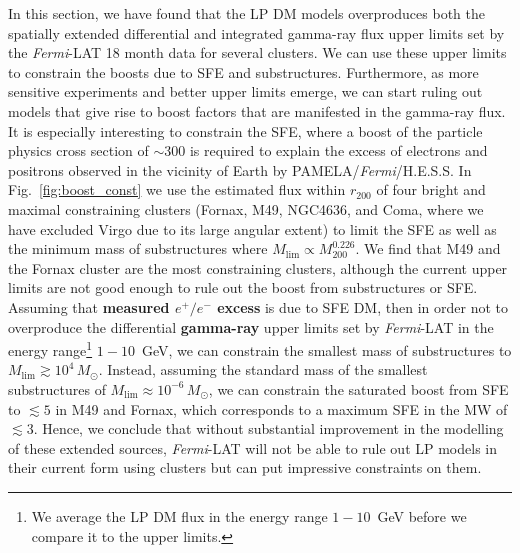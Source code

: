 \documentclass[10pt,aps,pra,reprint,amsmath,amsfonts,amssymb,showpacs,nofootinbib,floatfix]{revtex4-1}
\def\del#1{{}}
\def\C#1{{\bf #1}}
\newcommand{\Fermi}{{\em Fermi}\xspace}
\newcommand{\rmn}{\mathrm}
\newcommand{\msun}{M_\odot}
\newcommand{\rvir}{r_{200}}
\newcommand{\mvir}{M_{200}}
\begin{document}
In this section, we have found that the LP DM models overproduces both
the spatially extended differential and integrated gamma-ray flux
upper limits set by the \Fermi-LAT 18 month data for several
clusters. We can use these upper limits to constrain the boosts due to
SFE and substructures. Furthermore, as more sensitive experiments and
better upper limits emerge, we can start ruling out models that give
rise to boost factors that are manifested in the gamma-ray flux. It is
especially interesting to constrain the SFE, where a boost of the
particle physics cross section of $\sim$300 is required to explain the
excess of electrons and positrons observed in the vicinity of Earth by
PAMELA/\Fermi/H.E.S.S. In Fig.~\ref{fig:boost_const} we use the
estimated flux within $\rvir$ of four bright and maximal constraining
clusters (Fornax, M49, NGC4636, and Coma, where we have excluded Virgo
due to its large angular extent) to limit the SFE as well as the
minimum mass of substructures where
$M_\rmn{lim}\propto\mvir^{0.226}$. We find that M49 and the Fornax
cluster are the most constraining clusters, although the current upper
limits are not good enough to rule out the boost from substructures or
SFE. Assuming that \C{measured $e^+/e^-$ excess} \del{the PAMELA
  positron excess} is due to SFE DM, then in order not to overproduce
the differential \C{gamma-ray} upper limits set by \Fermi-LAT in the
energy range\footnote{We average the LP DM flux in the energy range
  $1-10$~GeV before we compare it to the upper limits.} $1-10$~GeV, we
can constrain the smallest mass of substructures to
$M_\rmn{lim}\gtrsim 10^4\,\msun$. Instead, assuming the standard mass
of the smallest substructures of $M_\rmn{lim}\approx 10^{-6}\,\msun$,
we can constrain the saturated boost from SFE to $\lesssim 5$ in M49
and Fornax, which corresponds to a maximum SFE in the MW of
$\lesssim3$. Hence, we conclude that without substantial improvement
in the modelling of these extended sources, \Fermi-LAT will not be
able to rule out LP models in their current form using clusters but
can put impressive constraints on them.
\end{document}
